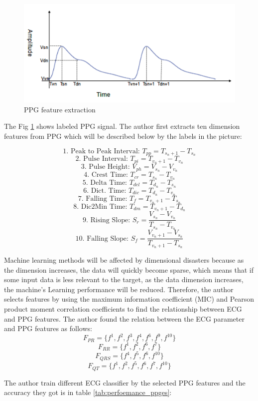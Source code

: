 \documentclass[a4paper,12pt]{article}
\begin{document}
\begin{figure}[H]
\centering
\includegraphics[width = .8\textwidth]{ppg1.PNG}
\caption{PPG feature extraction \autocite{Banerjee:2013estimation}}
\label{fig:ppg1}
\end{figure}

The Fig \ref{fig:ppg1} shows labeled PPG signal. The author first extracts ten dimension features from PPG which will be described below by the labels in the picture:

\[\textrm{1. Peak to Peak Interval: }T_{pp} = T_{{s_n}+1} - T_{s_n}\]
\[\textrm{2. Pulse Interval: }T_{pi} = T_{{v_n}+1} - T_{v_n}\]
\[\textrm{3. Pulse Height: }V_{ph} = V_{s_n} - V_{v_n}\]
\[\textrm{4. Crest Time: }T_{cr} = T_{s_n} - T_{v_n}\]
\[\textrm{5. Delta Time: }T_{del} = T_{d_n} - T_{s_n}\]
\[\textrm{6. Dict. Time: }T_{dic} = T_{d_n} - T_{v_n}\]
\[\textrm{7. Falling Time: }T_{f} = T_{{v_n}+1} - T_{s_n}\]
\[\textrm{8. Dic2Min Time: }T_{dm} = T_{{v_n}+1} - T_{d_n}\]
\[\textrm{9. Rising Slope: }S_{r} = \frac{V_{s_n} - V_{v_n}}{T_{s_n} - T_{v_n}}\]
\[\textrm{10. Falling Slope: }S_{f} = \frac{V_{{v_n} + 1} - V_{s_n}}{T_{{v_n} + 1} - T_{s_n}}\]

Machine learning methods will be affected by dimensional disasters because as the dimension increases, the data will quickly become sparse, which means that if some input data is less relevant to the target, as the data dimension increases, the machine's Learning performance will be reduced. Therefore, the author selects features by using the maximum information coefficient (MIC) and Pearson product moment correlation coefficients to find the relationship between ECG and PPG features. The author found the relation between the ECG parameter and PPG features as follows:
\[F_{PR} = \{f^1, f^2, f^3, f^4, f^6, f^9, f^{10}\}\]
\[F_{RR} = \{f^1, f^2, f^6, f^7\}\]
\[F_{QRS} = \{f^4, f^5, f^6, f^{10}\}\]
\[F_{QT} = \{f^1, f^2, f^5, f^6, f^7, f^{10}\}\]

The author train different ECG classifier by the selected PPG features and the accuracy they got is in table \ref{tab:perfoemance_ppges}:
\end{document}
